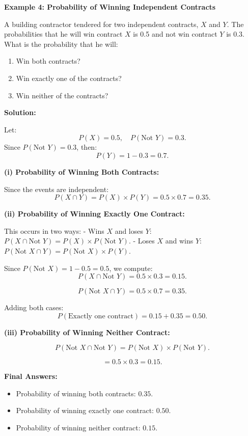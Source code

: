 \begin{flushleft}
	\textbf{Example 4: Probability of Winning Independent Contracts}
	
	A building contractor tendered for two independent contracts, $X$ and $Y$. The probabilities that he will win contract $X$ is 0.5 and not win contract $Y$ is 0.3. What is the probability that he will:
	
	\begin{enumerate}
		\item Win both contracts?
		\item Win exactly one of the contracts?
		\item Win neither of the contracts?
	\end{enumerate}
	
	\textbf{Solution:}
	
	Let:
	\[
	P(X) = 0.5, \quad P(\text{Not } Y) = 0.3.
	\]
	Since $P(\text{Not } Y) = 0.3$, then:
	\[
	P(Y) = 1 - 0.3 = 0.7.
	\]
	
	\textbf{(i) Probability of Winning Both Contracts:}
	
	Since the events are independent:
	\[
	P(X \cap Y) = P(X) \times P(Y) = 0.5 \times 0.7 = 0.35.
	\]
	
	\textbf{(ii) Probability of Winning Exactly One Contract:}
	
	This occurs in two ways:
	- Wins $X$ and loses $Y$: $P(X \cap \text{Not } Y) = P(X) \times P(\text{Not } Y)$.
	- Loses $X$ and wins $Y$: $P(\text{Not } X \cap Y) = P(\text{Not } X) \times P(Y)$.
	
	Since $P(\text{Not } X) = 1 - 0.5 = 0.5$, we compute:
	\[
	P(X \cap \text{Not } Y) = 0.5 \times 0.3 = 0.15.
	\]
	
	\[
	P(\text{Not } X \cap Y) = 0.5 \times 0.7 = 0.35.
	\]
	
	Adding both cases:
	\[
	P(\text{Exactly one contract}) = 0.15 + 0.35 = 0.50.
	\]
	
	\textbf{(iii) Probability of Winning Neither Contract:}
	
	\[
	P(\text{Not } X \cap \text{Not } Y) = P(\text{Not } X) \times P(\text{Not } Y).
	\]
	
	\[
	= 0.5 \times 0.3 = 0.15.
	\]
	
	\textbf{Final Answers:}
	\begin{itemize}
		\item Probability of winning both contracts: $0.35$.
		\item Probability of winning exactly one contract: $0.50$.
		\item Probability of winning neither contract: $0.15$.
	\end{itemize}
\end{flushleft}

